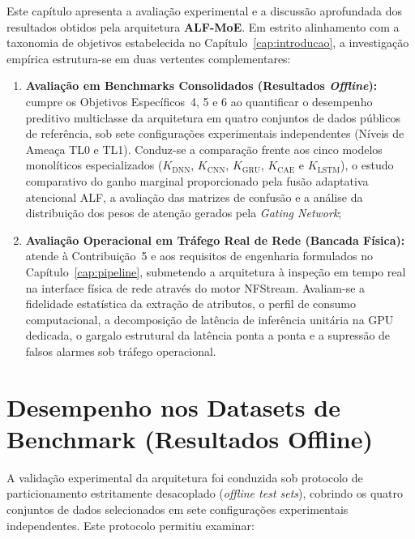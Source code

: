 Este capítulo apresenta a avaliação experimental e a discussão aprofundada dos resultados obtidos
pela arquitetura \textbf{ALF-MoE}. Em estrito alinhamento com a taxonomia de objetivos estabelecida
no Capítulo~\ref{cap:introducao}, a investigação empírica estrutura-se em duas vertentes
complementares:

\begin{enumerate}
    \item \textbf{Avaliação em Benchmarks Consolidados (Resultados \emph{Offline}):} cumpre os
    Objetivos Específicos~4, 5 e 6 ao quantificar o desempenho preditivo multiclasse da arquitetura
    em quatro conjuntos de dados públicos de referência, sob sete configurações experimentais
    independentes (Níveis de Ameaça TL0 e TL1). Conduz-se a comparação frente aos cinco modelos
    monolíticos especializados ($K_{\mathrm{DNN}}$, $K_{\mathrm{CNN}}$,
    $K_{\mathrm{GRU}}$, $K_{\mathrm{CAE}}$ e $K_{\mathrm{LSTM}}$), o
    estudo comparativo do ganho marginal proporcionado pela fusão adaptativa atencional ALF, a
    avaliação das matrizes de confusão e a análise da distribuição dos pesos de atenção gerados pela
    \emph{Gating Network};
    
    \item \textbf{Avaliação Operacional em Tráfego Real de Rede (Bancada Física):} atende à
    Contribuição~5 e aos requisitos de engenharia formulados no Capítulo~\ref{cap:pipeline},
    submetendo a arquitetura à inspeção em tempo real na interface física de rede através do motor
    NFStream. Avaliam-se a fidelidade estatística da extração de atributos, o perfil de consumo
    computacional, a decomposição de latência de inferência unitária na GPU dedicada, o gargalo
    estrutural da latência ponta a ponta e a supressão de falsos alarmes sob tráfego operacional.
\end{enumerate}

\section{Desempenho nos Datasets de Benchmark (Resultados Offline)}
\label{sec:desempenho_benchmark}

A validação experimental da arquitetura foi conduzida sob protocolo de particionamento estritamente
desacoplado (\emph{offline test sets}), cobrindo os quatro conjuntos de dados selecionados em sete
configurações experimentais independentes. Este protocolo permitiu examinar:

